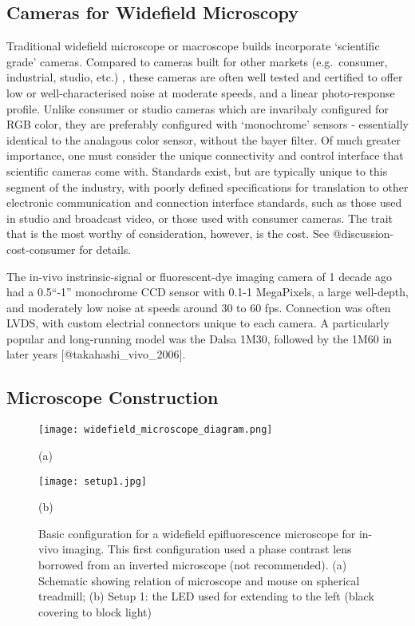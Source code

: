 \documentclass[../main.tex]{subfiles}
\begin{document}
\subsection{
	Cameras for Widefield Microscopy}\label{cameras-for-widefield-microscopy}

Traditional widefield microscope or macroscope builds incorporate `scientific grade' cameras.
Compared to cameras built for other markets (e.g.~consumer, industrial, studio, etc.)
, these cameras are often well
tested and certified to offer low or well-characterised noise at
moderate speeds, and a linear photo-response profile.
Unlike consumer or studio cameras which are invaribaly configured for RGB color, they are preferably configured with `monochrome' sensors - essentially identical to the analagous color sensor, without the bayer filter.
Of much greater importance, one must consider the unique connectivity and control interface that scientific cameras come with.
Standards exist, but are typically unique to this segment of the industry, with poorly defined specifications for translation to other electronic communication and connection interface standards, such as those used in studio and broadcast video, or those used with consumer cameras.
The trait that is the most worthy of consideration, however, is the cost.
See @discussion-cost-consumer for details.

The in-vivo instrinsic-signal or fluorescent-dye imaging camera of 1 decade ago had a 0.5``-1'' monochrome CCD sensor with 0.1-1 MegaPixels, a large well-depth, and moderately low noise at speeds around 30 to 60 fps.
Connection was often LVDS, with custom electrial connectors unique to each camera.
A particularly popular and long-running model was the Dalsa 1M30, followed by the 1M60 in later years {[}@takahashi\_vivo\_2006{]}.

\subsection{
	Microscope Construction}\label{microscope-construction}

\begin{figure}[htb]
	\begin{minipage}[t]{0.49\linewidth}\centering \texttt{[image: widefield\_microscope\_diagram.png]} \medskip \centerline{(a)}
	\end{minipage}
	\hfill
	\begin{minipage}[t]{0.49\linewidth}\centering \texttt{[image: setup1.jpg]} \medskip \centerline{(b)}
	\end{minipage}
	\caption{Basic configuration for a widefield epifluorescence microscope for in-vivo imaging.
		This first configuration used a phase contrast lens borrowed from an inverted microscope (not recommended).
		(a) Schematic showing relation of microscope and mouse on spherical treadmill; (b) Setup 1: the LED used for extending to the left (black covering to block light)}
	\label{fig:Sampling}
\end{figure}
\end{document}
